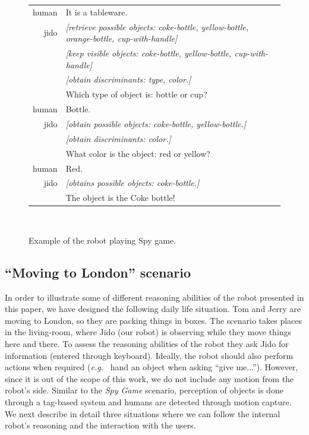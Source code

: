 \documentclass[twocolumn]{svjour3}
\newcommand{\chatN}[1]{{\footnotesize \textsf{#1}}}
\newcommand{\eg}{{\textit{e.g.~}}}
\begin{document}
\begin{figure}
\centering
	\begin{tabular}{r|p{6cm}}
		\chatN{human} & It is a tableware.\\
		\chatN{jido} & \emph{[retrieve possible objects: coke-bottle, yellow-bottle, orange-bottle, cup-with-handle]} \\
	 			& \emph{[keep visible objects: coke-bottle, yellow-bottle, cup-with-handle]}\\
				& \emph{[obtain discriminants: type, color.]}\\
				& Which type of object is: bottle or cup? \\
		\chatN{human} & Bottle.\\
		\chatN{jido} & \emph{[obtain possible objects: coke-bottle, yellow-bottle.]}\\
				& \emph{[obtain discriminants: color.]}\\
				& What color is the object: red or yellow?\\
		\chatN{human} & Red.\\
		\chatN{jido} & \emph{[obtains possible objects: coke-bottle.]}\\
				& The object is the Coke bottle!	
	\end{tabular}\\
	\caption{Example of the robot playing Spy game.}
	\label{fig|spyGameExample}
\end{figure}

\subsection{``Moving to London'' scenario}

In order to illustrate some of different reasoning abilities of the robot presented in this paper, we have designed the following
daily life situation. Tom and Jerry are moving to London, so they are packing
things in boxes. The scenario takes places in the living-room, where Jido (our
robot) is observing while they move things here and there. To assess the
reasoning abilities of the robot they ask Jido for information (entered through
keyboard). Ideally, the robot should also perform actions when required (\eg
hand an object when asking ``give me...''). However, since it is out of the
scope of this work, we do not include any motion from the robot's side. Similar
to the \emph{Spy Game} scenario, perception of objects is done through a tag-based
system and humans are detected through motion capture. We next describe in
detail three situations where we can follow the internal robot's reasoning and
the interaction with the users.
\end{document}
